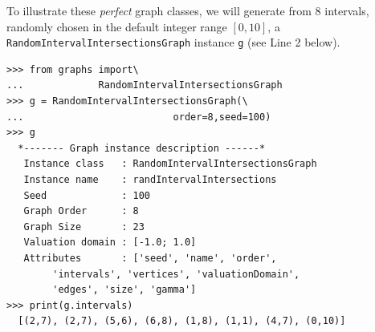 To illustrate these \emph{perfect} graph classes, we will generate from $8$ intervals, randomly chosen in the default integer range $[0,10]$, a \texttt{RandomIntervalInter\-sectionsGraph} instance \texttt{g} (see Line 2 below). 
\begin{lstlisting}
>>> from graphs import\
...             RandomIntervalIntersectionsGraph
>>> g = RandomIntervalIntersectionsGraph(\
...                          order=8,seed=100)
>>> g
  *------- Graph instance description ------*
   Instance class   : RandomIntervalIntersectionsGraph
   Instance name    : randIntervalIntersections
   Seed             : 100
   Graph Order      : 8
   Graph Size       : 23
   Valuation domain : [-1.0; 1.0]
   Attributes       : ['seed', 'name', 'order',
        'intervals', 'vertices', 'valuationDomain',
        'edges', 'size', 'gamma']
>>> print(g.intervals)
  [(2,7), (2,7), (5,6), (6,8), (1,8), (1,1), (4,7), (0,10)]
\end{lstlisting}

